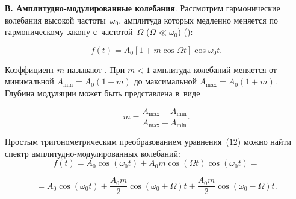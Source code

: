\begin{figure}
\end{figure}
\begin{figure}
\end{figure}

{\bf В. Амплитудно-модулированные колебания}. Рассмотрим гармонические колебания высокой частоты~$\omega_0$, амплитуда которых медленно меняется по гармоническому закону с~частотой~$\Omega$ ($\Omega\ll\omega_0$) ():

\begin{equation}
	f(t)=A_0 [1+m \cos\Omega t] \cos\omega_0 t.
\end{equation}
%

Коэффициент $m$ называют . При $m<1$ амплитуда колебаний меняется от минимальной
$A_{\min}=A_0(1-m)$ до максимальной $A_{\max}=A_0(1+m)$. Глубина модуляции может быть представлена в~виде

\begin{equation}
	m=\frac{A_{\max}-A_{\min}}{A_{\max}+A_{\min}}.
\end{equation}

Простым тригонометрическим преобразованием уравнения~(\r{12}) можно найти спектр амплитудно-модулированных колебаний:
\begin{equation}
	f(t) =A_0\cos(\omega_0 t)+A_0 m\cos(\Omega t)\cos(\omega_0 t) =
\end{equation}

\begin{equation}
	=A_0\cos(\omega_0 t)+ \frac{A_0 m}{2}\cos(\omega_0+\Omega)t+ \frac{A_0 m}{2}\cos(\omega_0-\Omega)t.
\end{equation}

\begin{figure}
\end{figure}

\begin{figure}
\end{figure}

